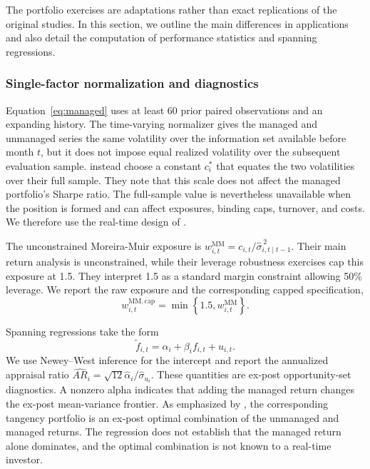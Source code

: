 \documentclass[preprint,12pt,authoryear]{elsarticle}
\begin{document}
\begin{appendices}
The portfolio exercises are adaptations rather than exact replications of the original studies. In this section, we outline the main differences in applications and also detail the computation of performance statistics and spanning regressions.

\subsubsection{Single-factor normalization and diagnostics}

Equation~\eqref{eq:managed} uses at least 60 prior paired observations and an expanding history. The time-varying normalizer gives the managed and unmanaged series the same volatility over the information set available before month $t$, but it does not impose equal realized volatility over the subsequent evaluation sample. \citet{moreiramuir2017} instead choose a constant $c_i^{*}$ that equates the two volatilities over their full sample. They note that this scale does not affect the managed portfolio's Sharpe ratio. The full-sample value is nevertheless unavailable when the position is formed and can affect exposures, binding caps, turnover, and costs. We therefore use the real-time design of \citet{cederburg2020}.

The unconstrained Moreira-Muir exposure is $w^{\mathrm{MM}}_{i,t}=c_{i,t}/\widehat{\sigma}^{\,2}_{i,t\mid t-1}$. Their main return analysis is unconstrained, while their leverage robustness exercises cap this exposure at 1.5. They interpret 1.5 as a standard margin constraint allowing 50\% leverage. We report the raw exposure and the corresponding capped specification,
\begin{equation}
w^{\mathrm{MM,cap}}_{i,t}
=\min\left\{1.5,w^{\mathrm{MM}}_{i,t}\right\}.
\end{equation}

Spanning regressions take the form
\begin{equation}
\widetilde{f}_{i,t} = \alpha_i + \beta_i f_{i,t} + u_{i,t}.
\label{eq:spanning}
\end{equation}
We use Newey--West inference for the intercept and report the annualized appraisal ratio $\widehat{AR}_i=\sqrt{12}\widehat{\alpha}_i/\widehat{\sigma}_{u_i}$. These quantities are ex-post opportunity-set diagnostics. A nonzero alpha indicates that adding the managed return changes the ex-post mean-variance frontier. As emphasized by \citet{cederburg2020}, the corresponding tangency portfolio is an ex-post optimal combination of the unmanaged and managed returns. The regression does not establish that the managed return alone dominates, and the optimal combination is not known to a real-time investor.


\end{appendices}
\end{document}
